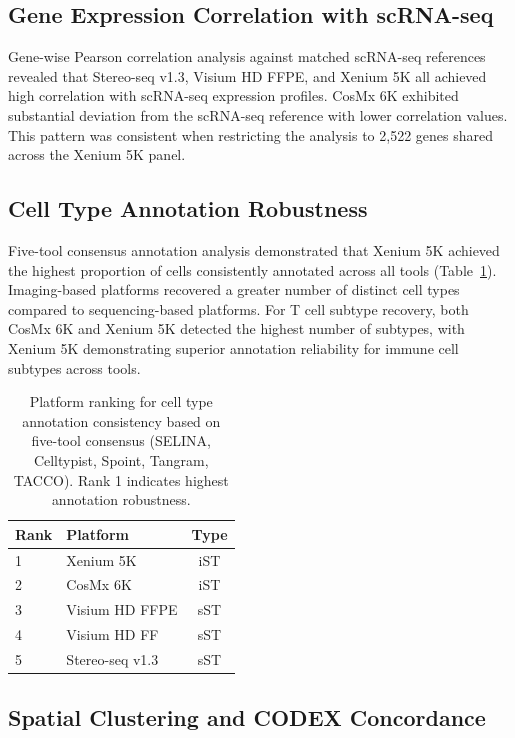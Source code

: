 \documentclass[11pt]{article}
\begin{document}
\subsection{Gene Expression Correlation with scRNA-seq}

Gene-wise Pearson correlation analysis against matched scRNA-seq references revealed that Stereo-seq v1.3, Visium HD FFPE, and Xenium 5K all achieved high correlation with scRNA-seq expression profiles. CosMx 6K exhibited substantial deviation from the scRNA-seq reference with lower correlation values. This pattern was consistent when restricting the analysis to 2,522 genes shared across the Xenium 5K panel.

\subsection{Cell Type Annotation Robustness}

Five-tool consensus annotation analysis demonstrated that Xenium 5K achieved the highest proportion of cells consistently annotated across all tools (Table~\ref{tab:annotation}). Imaging-based platforms recovered a greater number of distinct cell types compared to sequencing-based platforms. For T cell subtype recovery, both CosMx 6K and Xenium 5K detected the highest number of subtypes, with Xenium 5K demonstrating superior annotation reliability for immune cell subtypes across tools.

\begin{table}[ht]
\centering
\caption{Platform ranking for cell type annotation consistency based on five-tool consensus (SELINA, Celltypist, Spoint, Tangram, TACCO). Rank 1 indicates highest annotation robustness.}
\label{tab:annotation}
\begin{tabular}{@{}llc@{}}
\toprule
Rank & Platform & Type \\
\midrule
1 & Xenium 5K & iST \\
2 & CosMx 6K & iST \\
3 & Visium HD FFPE & sST \\
4 & Visium HD FF & sST \\
5 & Stereo-seq v1.3 & sST \\
\bottomrule
\end{tabular}
\end{table}

\subsection{Spatial Clustering and CODEX Concordance}
\end{document}
